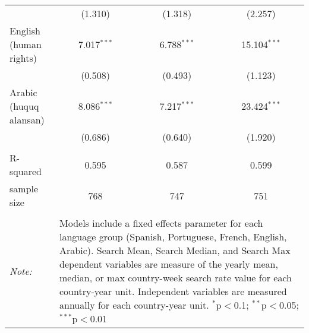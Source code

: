 \begin{table}[!htbp]
\begin{tabular}{@{\extracolsep{5pt}}lccc}
  & (1.310) & (1.318) & (2.257) \\ 
  English (human rights) & 7.017$^{***}$ & 6.788$^{***}$ & 15.104$^{***}$ \\ 
  & (0.508) & (0.493) & (1.123) \\ 
  Arabic (huquq alansan) & 8.086$^{***}$ & 7.217$^{***}$ & 23.424$^{***}$ \\ 
  & (0.686) & (0.640) & (1.920) \\ 
 \hline \\[-1.8ex] 
R-squared  & 0.595 & 0.587 & 0.599 \\ 
sample size  & 768 & 747 & 751 \\ 
\hline 
\hline \\[-1.8ex] 
\textit{Note:}  & \multicolumn{3}{l}{\parbox[t]{8cm}{Models include a fixed effects parameter for each language group (Spanish, Portuguese, French, English, Arabic). Search Mean, Search Median, and Search Max dependent variables are measure of the yearly mean, median, or max country-week search rate value for each country-year unit. Independent variables are measured annually for each country-year unit. $^{*}$p$<$0.1; $^{**}$p$<$0.05; $^{***}$p$<$0.01}} \\ 
\end{tabular} 
\end{table} 
